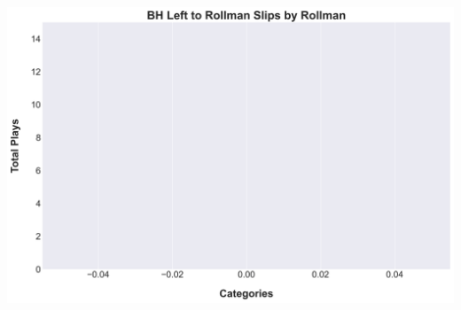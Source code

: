 \documentclass[a4paper,12pt]{article}
\begin{document}
\begin{table}[H]
{\begin{minipage}[t]{0.6\textwidth}
{\begin{tabular}
            \bottomrule
        \end{tabular}
        } %
    \end{minipage}
    } %
    \hfill %
    \begin{minipage}[c]{0.35\textwidth} %
        \flushright
        \includegraphics[width=\textwidth, height=.14\textheight]{images/PNR_PassLeftSlipsPlayer_Freq.png} %
    \end{minipage}
\end{table}

\vspace{-1em} %
\vspace{-1em} %
\end{document}
